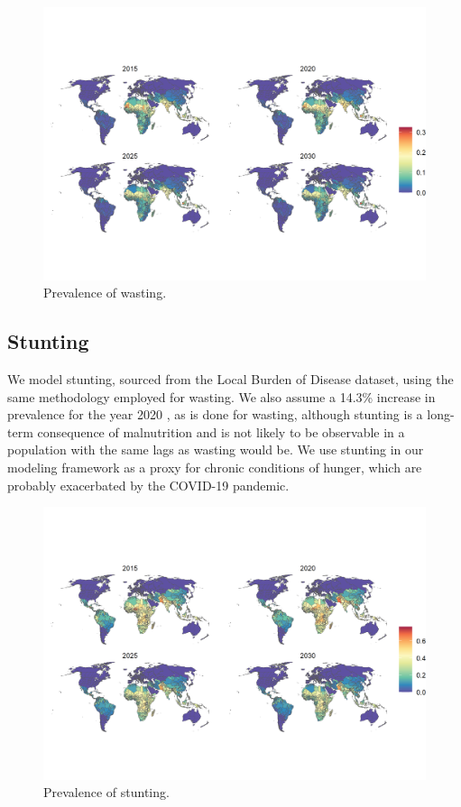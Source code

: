 \documentclass{article}
\begin{document}
\begin{figure}[H]
  \centering
  \includegraphics[width=\linewidth]{img/covars/wasting.png}
  \caption{Prevalence of wasting.}
\end{figure}

\pagebreak
\subsection{Stunting}
We model stunting, sourced from the Local Burden of Disease dataset, using the same methodology employed for wasting. We also assume a 14.3\% increase in prevalence for the year 2020 \citep{headey2020impacts}, as is done for wasting, although stunting is a long-term consequence of malnutrition and is not likely to be observable in a population with the same lags as wasting would be. We use stunting in our modeling framework as a proxy for chronic conditions of hunger, which are probably exacerbated by the COVID-19 pandemic. 

\begin{figure}[H]
  \centering
  \includegraphics[width=\linewidth]{img/covars/stunting.png}
  \caption{Prevalence of stunting.}
\end{figure}
\end{document}
